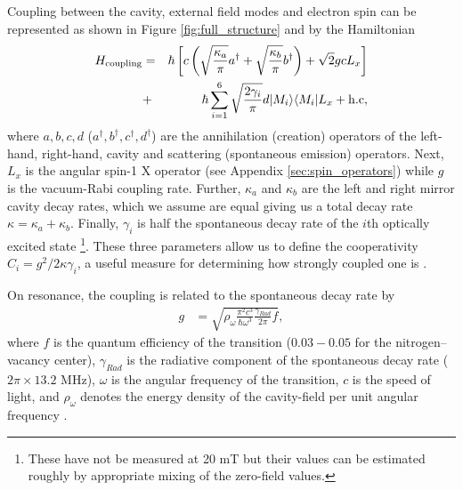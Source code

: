\documentclass[aps,pra,amsmath,amssymb,reprint,superscriptaddress,tightenlines]{revtex4-1}
\begin{document}
Coupling between the cavity, external field modes and electron spin can be represented as shown in Figure \ref{fig:full_structure} and by the Hamiltonian
\begin{eqnarray}
	H_{\rm coupling} &= & \hbar  \left[ c \left(\sqrt{\frac{\kappa_{a}}{\pi}} a^{\dagger}  + \sqrt{\frac{\kappa_{b}}{\pi}} b^{\dagger} \right) + \sqrt{2} g  c L_x \right]  \nonumber \\
	&+& \hbar \sum^{6}_{i=1} \sqrt{\frac{2\gamma_{i}}{\pi}}  d  |M_i\rangle \langle M_i | L_x  +{\rm h.c},
\label{eqn:HamCoupling}
\end{eqnarray}
where $a,b,c,d$ ($a^\dagger,b^\dagger,c^\dagger,d^\dagger$) are the annihilation (creation) operators of the left-hand, right-hand, cavity and scattering (spontaneous emission) operators. Next, $L_x$ is the angular spin-1 X operator (see Appendix \ref{sec:spin_operators}) while $g$ is the vacuum-Rabi coupling rate. Further, $\kappa_{a}$ and $\kappa_{b}$ are the left and right mirror cavity decay rates, which we assume are equal giving us a total decay rate $\kappa=\kappa_{a}+\kappa_{b}$. Finally, $\gamma_{i}$ is half the spontaneous decay rate of the $i$th optically excited state \footnote{These have not be measured at 20 mT but their values can be estimated roughly by appropriate mixing of the zero-field values.}. These three parameters allow us to define the cooperativity $C_i= g^{2}/2\kappa\gamma_i$, a useful measure for determining how strongly coupled one is \cite{Bonifacio76}.

On resonance, the coupling is related to the spontaneous decay rate by
\begin{eqnarray}
	g &= \sqrt{\rho_{\omega}\frac{\pi^{2}c^{3}}{\hbar \omega^{3}}\frac{\gamma_{Rad}}{2\pi} f},
\end{eqnarray}
where $f$ is the quantum efficiency of the transition ($0.03-0.05$ for the nitrogen--vacancy center), $\gamma_{Rad}$ is the radiative component of the spontaneous decay rate ($2\pi \times 13.2$ MHz), $\omega$ is the angular frequency of the transition, $c$ is the speed of light, and $\rho_{\omega}$ denotes the energy density of the cavity-field per unit angular frequency \cite{Hilborn82}.
\end{document}
